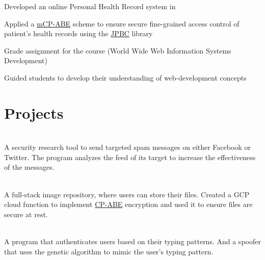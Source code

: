 \documentclass[]{resume-openfont}
\begin{document}
\begin{tightemize}
    \item Developed an online Personal Health Record system in 
    \item Applied a
    \href{https://link.springer.com/chapter/10.1007/978-3-642-10838-9\_23}{mCP-ABE} scheme to ensure secure fine-grained access control of patient's health records using the \href{http://gas.dia.unisa.it/projects/jpbc/}{JPBC} library
\end{tightemize}

\begin{tightemize}
    \item Grade assignment for the course (World Wide Web Information Systems Development)
    \item Guided students to develop their understanding of web-development concepts
\end{tightemize}

\sectionsep
%
%
\section{Projects}

\\
A security research tool to send targeted spam messages on either Facebook or Twitter. The program analyzes the feed of its target to increase the effectiveness of the messages.\\
\sectionsep
  
\hfill \\
A full-stack image repository, where users can store their files. Created a GCP cloud function to implement \href{https://www.cs.utexas.edu/~bwaters/publications/papers/cp-abe.pdf}{CP-ABE} encryption and used it to ensure files are secure at rest.\\
\sectionsep
  

\\
A program that authenticates users based on their typing patterns. And a spoofer that uses the genetic algorithm to mimic the user's typing pattern.
\\
\sectionsep
\end{document}
